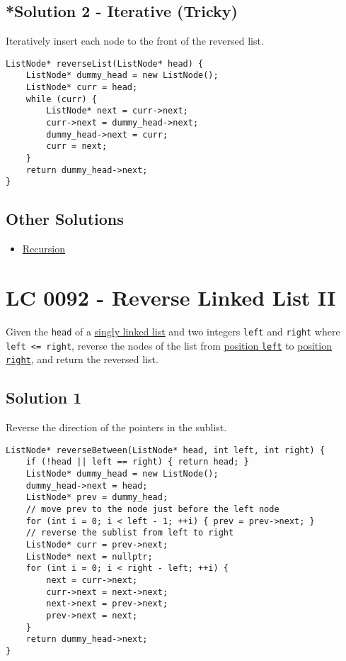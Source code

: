 \subsection*{*Solution 2 - Iterative (Tricky)}\label{solution:lc0206_iterative2}
Iteratively insert each node to the front of the reversed list.
\begin{lstlisting}
ListNode* reverseList(ListNode* head) {
	ListNode* dummy_head = new ListNode();
	ListNode* curr = head;
	while (curr) {
		ListNode* next = curr->next;
		curr->next = dummy_head->next;
		dummy_head->next = curr;
		curr = next;
	}
	return dummy_head->next;
}
\end{lstlisting}

\subsection*{Other Solutions}
\begin{itemize}
	\item \hyperref[solution:lc0206_recursion]{Recursion}
\end{itemize}

\section{LC 0092 - Reverse Linked List II}
Given the {\colorbox{CodeBackground}{\lstinline|head|}} of a \ul{singly linked list} and two integers {\colorbox{CodeBackground}{\lstinline|left|}} and {\colorbox{CodeBackground}{\lstinline|right|}} where {\colorbox{CodeBackground}{\lstinline|left <= right|}}, reverse the nodes of the list from \ul{position {\colorbox{CodeBackground}{\lstinline|left|}}} to \ul{position {\colorbox{CodeBackground}{\lstinline|right|}}}, and return the reversed list.

\subsection*{Solution 1}
Reverse the direction of the pointers in the sublist.
\begin{lstlisting}
ListNode* reverseBetween(ListNode* head, int left, int right) {
	if (!head || left == right) { return head; }
	ListNode* dummy_head = new ListNode();
	dummy_head->next = head;
	ListNode* prev = dummy_head;
	// move prev to the node just before the left node
	for (int i = 0; i < left - 1; ++i) { prev = prev->next; }
	// reverse the sublist from left to right
	ListNode* curr = prev->next;
	ListNode* next = nullptr;
	for (int i = 0; i < right - left; ++i) {
		next = curr->next;
		curr->next = next->next;
		next->next = prev->next;
		prev->next = next;
	}
	return dummy_head->next;
}
\end{lstlisting}

